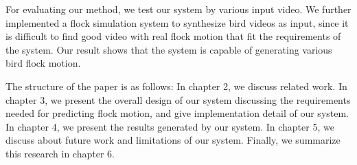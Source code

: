 For evaluating our method, we test our system by various input video. We further implemented a flock simulation system to synthesize bird videos as input, since it is difficult to find good video with real flock motion that fit the requirements of the system. Our result shows that the system is capable of generating various bird flock motion.


The structure of the paper is as follows: In chapter 2, we discuss related work. In chapter 3, we present the overall design of our system discussing the requirements needed for predicting flock motion, and give implementation detail of our system. In chapter 4, we present the results generated by our system. In chapter 5, we discuss about future work and limitations of our system. Finally, we summarize this research in chapter 6.

